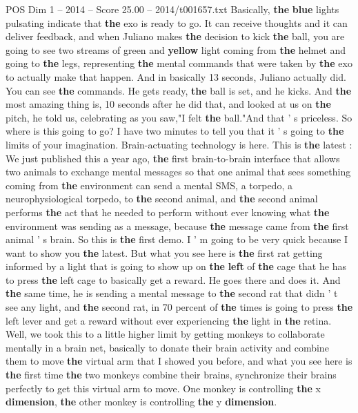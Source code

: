 \begin{textsample}{POS Dim 1 – 2014 – Score 25.00 – 2014/t001657.txt}
Basically, \textbf{the} \textbf{blue} lights pulsating indicate that \textbf{the} exo is ready to go.
It can receive thoughts and it can deliver feedback, and when Juliano makes \textbf{the} decision to kick \textbf{the} ball, you are going to see two streams of green and \textbf{yellow} light coming from \textbf{the} helmet and going to \textbf{the} legs, representing \textbf{the} mental commands that were taken by \textbf{the} exo to actually make that happen.
And in basically 13 seconds, Juliano actually did.
You can see \textbf{the} commands.
He gets ready, \textbf{the} ball is set, and he kicks.
And \textbf{the} most amazing thing is, 10 seconds after he did that, and looked at us on \textbf{the} pitch, he told us, celebrating as you saw,"I felt \textbf{the} ball."And that ' s priceless.
So where is this going to go?
I have two minutes to tell you that it ' s going to \textbf{the} limits of your imagination.
Brain-actuating technology is here.
This is \textbf{the} latest : We just published this a year ago, \textbf{the} first brain-to-brain interface that allows two animals to exchange mental messages so that one animal that sees something coming from \textbf{the} environment can send a mental SMS, a torpedo, a neurophysiological torpedo, to \textbf{the} second animal, and \textbf{the} second animal performs \textbf{the} act that he needed to perform without ever knowing what \textbf{the} environment was sending as a message, because \textbf{the} message came from \textbf{the} first animal ' s brain.
So this is \textbf{the} first demo.
I ' m going to be very quick because I want to show you \textbf{the} latest.
But what you see here is \textbf{the} first rat getting informed by a light that is going to show up on \textbf{the} \textbf{left} of \textbf{the} cage that he has to press \textbf{the} left cage to basically get a reward.
He goes there and does it.
And \textbf{the} same time, he is sending a mental message to \textbf{the} second rat that didn ' t see any light, and \textbf{the} second rat, in 70 percent of \textbf{the} times is going to press \textbf{the} left lever and get a reward without ever experiencing \textbf{the} light in \textbf{the} retina.
Well, we took this to a little higher limit by getting monkeys to collaborate mentally in a brain net, basically to donate their brain activity and combine them to move \textbf{the} virtual arm that I showed you before, and what you see here is \textbf{the} first time \textbf{the} two monkeys combine their brains, synchronize their brains perfectly to get this virtual arm to move.
One monkey is controlling \textbf{the} x \textbf{dimension}, \textbf{the} other monkey is controlling \textbf{the} y \textbf{dimension}.

\end{textsample}
